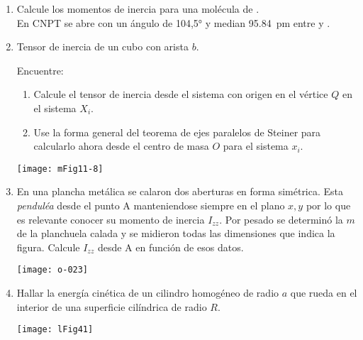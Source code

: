 \documentclass[11pt, spanish, a4paper, twopage]{article}
\begin{document}
\begin{enumerate}
\item Calcule los momentos de inercia para una molécula de .\\
En CNPT se abre con un ángulo de \ang{104,5;;} y median \SI{95.84}{\pico\metre} entre  y .



\item 
\begin{minipage}[t][3.7cm]{0.6\textwidth}
Tensor de inercia de un cubo con arista \(b\).
	
Encuentre: 
\begin{enumerate}
	\item Calcule el tensor de inercia desde el sistema con origen en el vértice \(Q\) en el sistema \(X_i\).
	\item Use la forma general del teorema de ejes paralelos de Steiner para calcularlo ahora desde el centro de masa \(O\) para el sistema \(x_i\).
	\end{enumerate}
\end{minipage}
\begin{minipage}[c][1.2cm][t]{0.35\textwidth}
	\texttt{[image: mFig11-8]}
\end{minipage}



\item 
\begin{minipage}[t][3cm]{0.5\textwidth}
En una plancha metálica se calaron dos aberturas en forma simétrica.
Esta \emph{penduléa} desde el punto A manteniendose siempre en el plano \(x,y\) por lo que es relevante conocer su momento de inercia \(I_{zz}\).
Por pesado se determinó la $m$ de la planchuela calada y se midieron todas las dimensiones que indica la figura.
Calcule \(I_{zz}\) desde A en función de esos datos.
\end{minipage}
\begin{minipage}[c][4cm][t]{0.45\textwidth}
	\texttt{[image: o-023]}
\end{minipage}



\item 
\begin{minipage}[t][1.5cm]{0.65\textwidth}
	Hallar la energía cinética de un cilindro homogéneo de radio \(a\) que rueda en el interior de una superficie cilíndrica de radio \(R\).
\end{minipage}
\begin{minipage}[c][1.5cm][t]{0.3\textwidth}
\texttt{[image: lFig41]}
\end{minipage}




\end{enumerate}
\end{document}
